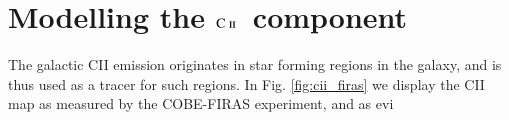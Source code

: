 \documentclass{aa}
\newcommand{\mathsc}[1]{{\normalfont\textsc{#1}}}
\newcommand{\G}[0]{\tens{G}}
\renewcommand{\a}[0]{\vec{a}}
\newcommand{\dv}[0]{\vec{d}}
\newcommand{\cii}{\ensuremath{\mathsc {C\ ii}}}
\begin{document}
%
%


\clearpage
\section{Modelling the \cii\ component}
The galactic CII emission originates in star forming regions in the
galaxy, and is thus used as a tracer for such regions. In Fig. \ref{fig:cii_firas} we display the CII map as measured by the COBE-FIRAS experiment\citep{fixsen:1994,mather:1999}, and as evi
\end{document}
